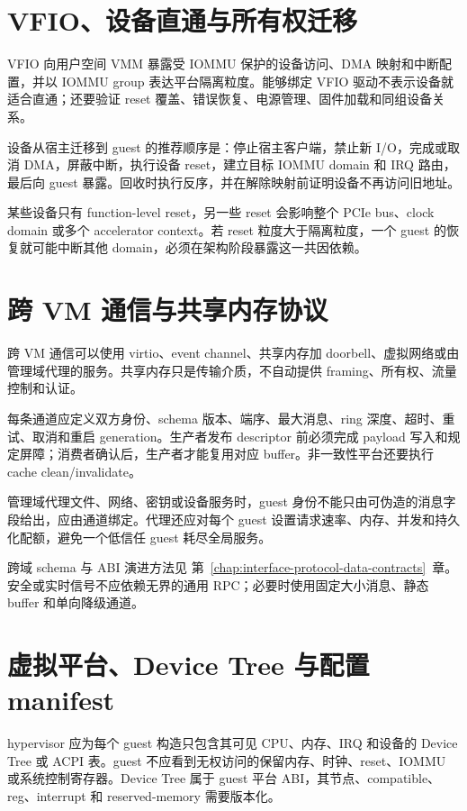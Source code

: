 \section{VFIO、设备直通与所有权迁移}

VFIO 向用户空间 VMM 暴露受 IOMMU 保护的设备访问、DMA 映射和中断配置，并以 IOMMU group 表达平台隔离粒度\cite{linux-vfio}。能够绑定 VFIO 驱动不表示设备就适合直通；还要验证 reset 覆盖、错误恢复、电源管理、固件加载和同组设备关系。

设备从宿主迁移到 guest 的推荐顺序是：停止宿主客户端，禁止新 I/O，完成或取消 DMA，屏蔽中断，执行设备 reset，建立目标 IOMMU domain 和 IRQ 路由，最后向 guest 暴露。回收时执行反序，并在解除映射前证明设备不再访问旧地址。

某些设备只有 function-level reset，另一些 reset 会影响整个 PCIe bus、clock domain 或多个 accelerator context。若 reset 粒度大于隔离粒度，一个 guest 的恢复就可能中断其他 domain，必须在架构阶段暴露这一共因依赖。

\section{跨 VM 通信与共享内存协议}

跨 VM 通信可以使用 virtio、event channel、共享内存加 doorbell、虚拟网络或由管理域代理的服务。共享内存只是传输介质，不自动提供 framing、所有权、流量控制和认证。

每条通道应定义双方身份、schema 版本、端序、最大消息、ring 深度、超时、重试、取消和重启 generation。生产者发布 descriptor 前必须完成 payload 写入和规定屏障；消费者确认后，生产者才能复用对应 buffer。非一致性平台还要执行 cache clean/invalidate。

管理域代理文件、网络、密钥或设备服务时，guest 身份不能只由可伪造的消息字段给出，应由通道绑定。代理还应对每个 guest 设置请求速率、内存、并发和持久化配额，避免一个低信任 guest 耗尽全局服务。

跨域 schema 与 ABI 演进方法见 \mbox{第~\ref{chap:interface-protocol-data-contracts}~章}。安全或实时信号不应依赖无界的通用 RPC；必要时使用固定大小消息、静态 buffer 和单向降级通道。

\section{虚拟平台、Device Tree 与配置 manifest}

hypervisor 应为每个 guest 构造只包含其可见 CPU、内存、IRQ 和设备的 Device Tree 或 ACPI 表。guest 不应看到无权访问的保留内存、时钟、reset、IOMMU 或系统控制寄存器。Device Tree 属于 guest 平台 ABI，其节点、compatible、reg、interrupt 和 reserved-memory 需要版本化\cite{devicetree-spec}。

